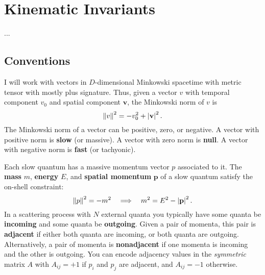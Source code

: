 \chapter{Kinematic Invariants}
...
\section{Conventions}
I will work with vectors in $D$-dimensional Minkowski spacetime with metric tensor with mostly plus signature. Thus, given a vector $v$ with temporal component $v_{0}$ and spatial component $\mathbf{v}$, the Minkowski norm of $v$ is
\begin{equation}
	\left\Vert v \right\Vert^{2} = -v_{0}^{2} + \left\lvert \mathbf{v} \right\rvert^{2}.
\end{equation}
The Minkowski norm of a vector can be positive, zero, or negative. A vector with positive norm is \textbf{slow} (or massive). A vector with zero norm is \textbf{null}. A vector with negative norm is \textbf{fast} (or tachyonic).

Each slow quantum has a massive momentum vector $p$ associated to it. The \textbf{mass} $m$, \textbf{energy} $E$, and \textbf{spatial momentum} $\mathbf{p}$ of a slow quantum satisfy the on-shell constraint:
\begin{equation}
	\left\Vert p \right\Vert^{2} = - m^{2} \quad \Longrightarrow \quad m^{2} = E^{2} - \left\lvert \mathbf{p} \right\rvert^{2}.
\end{equation}
In a scattering process with $N$ external quanta you typically have some quanta be \textbf{incoming} and some quanta be \textbf{outgoing}. Given a pair of momenta, this pair is \textbf{adjacent} if either both quanta are incoming, or both quanta are outgoing. Alternatively, a pair of momenta is \textbf{nonadjacent} if one momenta is incoming and the other is outgoing. You can encode adjacency values in the \textit{symmetric} matrix $A$ with $A_{ij} = +1$ if $p_{i}$ and $p_{j}$ are adjacent, and $A_{ij} = -1$ otherwise.


